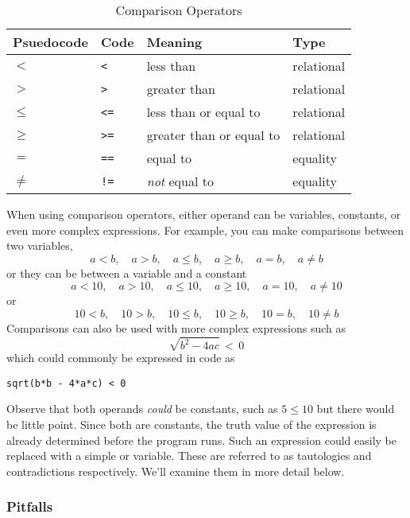   \begin{table}
    \centering
    \begin{tabular}{llll}
    \hline
    \textbf{Psuedocode} & \textbf{Code} & \textbf{Meaning}       & \textbf{Type} \\
    \hline
    $<$ & \texttt{<}     & less than                & relational \\
    $>$ & \texttt{>}     & greater than             & relational \\
    $\leq$ & \texttt{<=}    & less than or equal to    & relational \\
    $\geq$ & \texttt{>=}    & greater than or equal to & relational \\
    $=$ & \texttt{==}    & equal to                 & equality   \\
    $\neq$ & \texttt{!=}    & \textit{not} equal to    & equality   \\
    \hline
    \end{tabular}
    \caption{Comparison Operators}
    \label{table:comparisonOperators}
  \end{table}

When using comparison operators, either operand can be variables, constants, or even
more complex expressions.  For example, you can make comparisons between two
variables, 
  $$a < b, \quad a > b, \quad a \leq b,\quad a \geq b,\quad a = b,\quad a \neq b$$
or they can be between a variable and a constant
  $$a < 10,\quad a > 10,\quad a \leq 10,\quad a \geq 10,\quad a = 10,\quad a \neq 10$$
or
  $$10 < b,\quad 10 > b,\quad 10 \leq b,\quad 10 \geq b,\quad 10 = b,\quad 10 \neq b$$
Comparisons can also be used with more complex expressions such as
  $$\sqrt{b^2 - 4ac} \, < \, 0$$
which could commonly be expressed in code as 

\texttt{sqrt(b*b - 4*a*c) < 0}

Observe that both operands \emph{could} be constants, such as $5 \leq 10$
but there would be little point.  Since both are constants, the truth value of
the expression is already determined before the program runs.  Such an
expression could easily be replaced with a simple \True or \False variable.
These are referred to as tautologies and contradictions respectively.  We'll
examine them in more detail below.

\subsubsection{Pitfalls}

